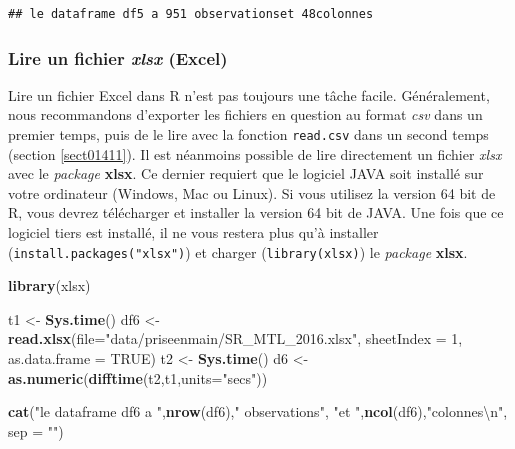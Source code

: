 \documentclass[
  11pt,
  french,
]{book}
\makeatletter
\newenvironment{Shaded}{\begin{snugshade}}{\end{snugshade}}
\newcommand{\CharTok}[1]{\textcolor[rgb]{0.31,0.60,0.02}{#1}}
\newcommand{\DataTypeTok}[1]{\textcolor[rgb]{0.13,0.29,0.53}{#1}}
\newcommand{\DecValTok}[1]{\textcolor[rgb]{0.00,0.00,0.81}{#1}}
\newcommand{\KeywordTok}[1]{\textcolor[rgb]{0.13,0.29,0.53}{\textbf{#1}}}
\newcommand{\NormalTok}[1]{#1}
\newcommand{\OtherTok}[1]{\textcolor[rgb]{0.56,0.35,0.01}{#1}}
\newcommand{\StringTok}[1]{\textcolor[rgb]{0.31,0.60,0.02}{#1}}
\newenvironment{kframe}{%
\medskip{}
\setlength{\fboxsep}{.8em}
 \def\at@end@of@kframe{}%
 \ifinner\ifhmode%
  \def\at@end@of@kframe{\end{minipage}}%
  \begin{minipage}{\columnwidth}%
 \fi\fi%
 \def\FrameCommand##1{\hskip\@totalleftmargin \hskip-\fboxsep
 \colorbox{shadecolor}{##1}\hskip-\fboxsep
     \hskip-\linewidth \hskip-\@totalleftmargin \hskip\columnwidth}%
 \MakeFramed {\advance\hsize-\width
   \@totalleftmargin\z@ \linewidth\hsize
   \@setminipage}}%
 {\par\unskip\endMakeFramed%
 \at@end@of@kframe}
\renewenvironment{Shaded}{\begin{kframe}}{\end{kframe}}
\makeatother
\begin{document}
\begin{verbatim}
## le dataframe df5 a 951 observationset 48colonnes
\end{verbatim}

\hypertarget{sect01416}{%
\subsubsection{\texorpdfstring{Lire un fichier \emph{xlsx} (Excel)}{Lire un fichier xlsx (Excel)}}\label{sect01416}}

Lire un fichier Excel dans R n'est pas toujours une tâche facile. Généralement, nous recommandons d'exporter les fichiers en question au format \emph{csv} dans un premier temps, puis de le lire avec la fonction \texttt{read.csv} dans un second temps (section \ref{sect01411}).
Il est néanmoins possible de lire directement un fichier \emph{xlsx} avec le \emph{package} \textbf{xlsx}. Ce dernier requiert que le logiciel JAVA soit installé sur votre ordinateur (Windows, Mac ou Linux). Si vous utilisez la version 64 bit de R, vous devrez télécharger et installer la version 64 bit de JAVA. Une fois que ce logiciel tiers est installé, il ne vous restera plus qu'à installer (\texttt{install.packages("xlsx")}) et charger (\texttt{library(xlsx)}) le \emph{package} \textbf{xlsx}.

\begin{Shaded}
\begin{Highlighting}[]
\KeywordTok{library}\NormalTok{(xlsx)}

\NormalTok{t1 <-}\StringTok{ }\KeywordTok{Sys.time}\NormalTok{()}
\NormalTok{df6 <-}\StringTok{ }\KeywordTok{read.xlsx}\NormalTok{(}\DataTypeTok{file=}\StringTok{"data/priseenmain/SR_MTL_2016.xlsx"}\NormalTok{,}
                 \DataTypeTok{sheetIndex =} \DecValTok{1}\NormalTok{,}
                 \DataTypeTok{as.data.frame =} \OtherTok{TRUE}\NormalTok{)}
\NormalTok{t2 <-}\StringTok{ }\KeywordTok{Sys.time}\NormalTok{()}
\NormalTok{d6 <-}\StringTok{ }\KeywordTok{as.numeric}\NormalTok{(}\KeywordTok{difftime}\NormalTok{(t2,t1,}\DataTypeTok{units=}\StringTok{"secs"}\NormalTok{))}

\KeywordTok{cat}\NormalTok{(}\StringTok{"le dataframe df6 a "}\NormalTok{,}\KeywordTok{nrow}\NormalTok{(df6),}\StringTok{" observations"}\NormalTok{,}
    \StringTok{"et "}\NormalTok{,}\KeywordTok{ncol}\NormalTok{(df6),}\StringTok{"colonnes}\CharTok{\textbackslash{}n}\StringTok{"}\NormalTok{, }\DataTypeTok{sep =} \StringTok{""}\NormalTok{)}
\end{Highlighting}
\end{Shaded}
\end{document}
